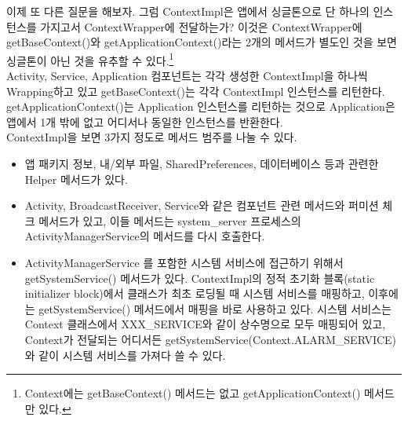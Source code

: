 이제 또 다른 질문을 해보자. 그럼 ContextImpl은 앱에서 싱글톤으로 단 하나의 인스턴스를 가지고서 ContextWrapper에 전달하는가?
이것은 ContextWrapper에 getBaseContext()와 getApplicationContext()라는 2개의 메서드가 별도인 것을 보면 싱글톤이 아닌 것을 유추할 수 있다.\footnote{Context에는 getBaseContext() 메서드는 없고 getApplicationContext() 메서드만 있다.}\\

Activity, Service, Application 컴포넌트는 각각 생성한 ContextImpl을 하나씩 Wrapping하고 있고 getBaseContext()는 각각 ContextImpl 인스턴스를 리턴한다. getApplicationContext()는 Application 인스턴스를 리턴하는 것으로 Application은 앱에서 1개 밖에 없고 어디서나 동일한 인스턴스를 반환한다.\\

ContextImpl을 보면 3가지 정도로 메서드 범주를 나눌 수 있다.
\begin{itemize}
\item 앱 패키지 정보, 내/외부 파일, SharedPreferences, 데이터베이스 등과 관련한 Helper 메서드가 있다. 

\item Activity, BroadcastReceiver, Service와 같은 컴포넌트 관련 메서드와 퍼미션 체크 메서드가 있고, 이들 메서드는 system\_server 프로세스의 ActivityManagerService의 메서드를 다시 호출한다. 

\item ActivityManagerService 를 포함한 시스템 서비스에 접근하기 위해서 getSystemService() 메서드가 있다. 
ContextImpl의 정적 초기화 블록(static initializer block)에서 클래스가 최초 로딩될 때 시스템 서비스를 매핑하고, 이후에는 getSystemService() 메서드에서 매핑을 바로 사용하고 있다.
시스템 서비스는 Context 클래스에서 XXX\_SERVICE와 같이 상수명으로 모두 매핑되어 있고, Context가 전달되는 어디서든 getSystemService(Context.ALARM\_SERVICE)와 같이 시스템 서비스를 가져다 쓸 수 있다.
\end{itemize}

